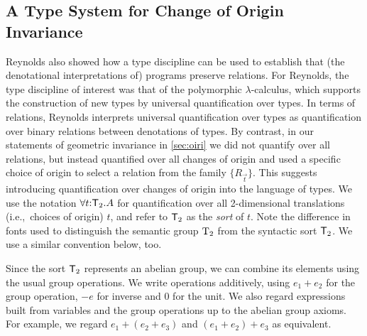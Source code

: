 
\subsection{A Type System for Change of Origin Invariance}
\label{sec:type-system-geom-intro}

Reynolds also showed how a type discipline can be used to establish
that (the denotational interpretations of) programs preserve
relations. For Reynolds, the type discipline of interest was that of
the polymorphic $\lambda$-calculus, which supports the construction of
new types by universal quantification over types.
In terms of relations, Reynolds interprets universal quantification
over types as quantification over binary relations between denotations
of types. By contrast, in our statements of geometric invariance in
\autoref{sec:oiri} we did not quantify over all
relations, but instead quantified over all changes of origin and used
a specific choice of origin to select a relation from the family
$\{R_{\vec{t}}\}$. This suggests introducing quantification over
changes of origin into the language of types. We use the notation
$\forall t \mathord: \mathsf{T}_2. A$ for quantification over all
2-dimensional translations (i.e.,~choices of origin) $t$, and refer to
$\mathsf{T}_2$ as the \emph{sort} of $t$. Note the difference in
fonts used to distinguish the semantic group $\mathrm{T}_2$ from the
syntactic sort $\mathsf{T}_2$. We use a similar convention
below, too.

Since the sort $\mathsf{T}_2$ represents an abelian group, we can
combine its elements using the usual group operations. We write
operations additively, using $e_1 + e_2$ for the group operation, $-e$
for inverse and $0$ for the unit.  We also regard expressions built
from variables and the group operations up to the abelian group
axioms. For example, we regard $e_1 + (e_2 + e_3)$ and $(e_1 + e_2) +
e_3$ as equivalent.

